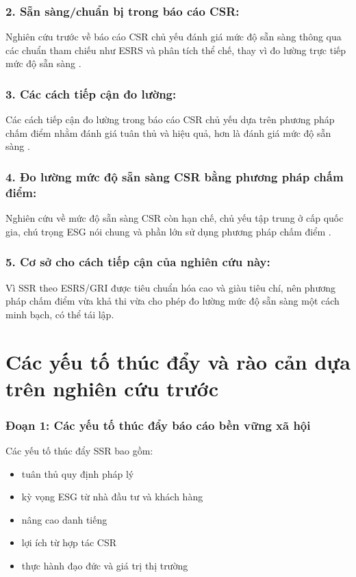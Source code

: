 \subsubsection{2. Sẵn sàng/chuẩn bị trong báo cáo CSR:}
Nghiên cứu trước về báo cáo CSR chủ yếu đánh giá mức độ sẵn sàng thông qua các chuẩn tham chiếu như ESRS và phân tích thể chế, thay vì đo lường trực tiếp mức độ sẵn sàng \parencite{Filho2025,Shabana2017}.

\subsubsection{3. Các cách tiếp cận đo lường:}
Các cách tiếp cận đo lường trong báo cáo CSR chủ yếu dựa trên phương pháp chấm điểm nhằm đánh giá tuân thủ và hiệu quả, hơn là đánh giá mức độ sẵn sàng \parencite{Tobias2022,Papoutsi2020,Gai2023,Nicolo2025}.

\subsubsection{4. Đo lường mức độ sẵn sàng CSR bằng phương pháp chấm điểm:}
Nghiên cứu về mức độ sẵn sàng CSR còn hạn chế, chủ yếu tập trung ở cấp quốc gia, chú trọng ESG nói chung và phần lớn sử dụng phương pháp chấm điểm \parencite{Nguyen2024,Montero2025}.

\subsubsection{5. Cơ sở cho cách tiếp cận của nghiên cứu này:}
Vì SSR theo ESRS/GRI được tiêu chuẩn hóa cao và giàu tiêu chí, nên phương pháp chấm điểm vừa khả thi vừa cho phép đo lường mức độ sẵn sàng một cách minh bạch, có thể tái lập.

\section{Các yếu tố thúc đẩy và rào cản dựa trên nghiên cứu trước}

\subsubsection{Đoạn 1: Các yếu tố thúc đẩy báo cáo bền vững xã hội}

Các yếu tố thúc đẩy SSR bao gồm:
\begin{itemize}
\item tuân thủ quy định pháp lý \parencite{Reitmaier2024,Bochkay2025}
\item kỳ vọng ESG từ nhà đầu tư và khách hàng \parencite{Bonnefon2025,Dai2021}
\item nâng cao danh tiếng \parencite{Reitmaier2024}
\item lợi ích từ hợp tác CSR \parencite{Dai2021}
\item thực hành đạo đức và giá trị thị trường \parencite{Chouaibi2021}
\end{itemize}

